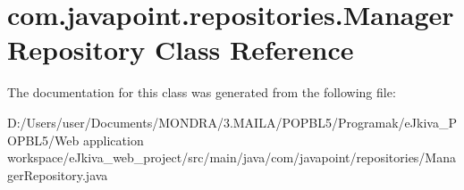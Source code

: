 \hypertarget{classcom_1_1javapoint_1_1repositories_1_1_manager_repository}{}\section{com.\+javapoint.\+repositories.\+Manager\+Repository Class Reference}
\label{classcom_1_1javapoint_1_1repositories_1_1_manager_repository}


The documentation for this class was generated from the following file\+:\begin{DoxyCompactItemize}
\item 
D\+:/\+Users/user/\+Documents/\+M\+O\+N\+D\+R\+A/3.\+M\+A\+I\+L\+A/\+P\+O\+P\+B\+L5/\+Programak/e\+Jkiva\+\_\+\+P\+O\+P\+B\+L5/\+Web application workspace/e\+Jkiva\+\_\+web\+\_\+project/src/main/java/com/javapoint/repositories/Manager\+Repository.\+java\end{DoxyCompactItemize}
